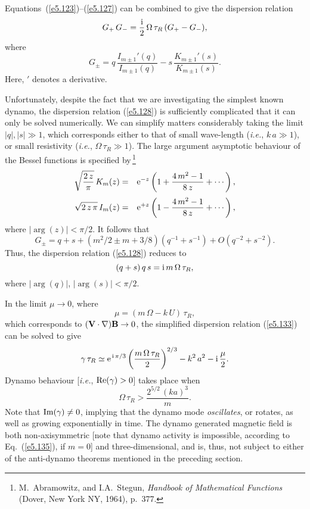 Equations~(\ref{e5.123})--(\ref{e5.127}) can be combined to give the dispersion relation
\begin{equation}\label{e5.128}
G_+\,G_- = \frac{{\rm i}}{2}\,{\Omega}\,\tau_R\,(G_+-G_-),
\end{equation}
where
\begin{equation}
G_\pm = q\,\frac{I_{m\pm 1}'(q)}{I_{m\pm 1}(q)} - s\,\frac{K_{m\pm 1}'(s)}
{K_{m\pm 1}(s)}.
\end{equation}
Here, $'$ denotes a derivative.

Unfortunately, despite the fact that we are investigating the simplest known dynamo,
the dispersion relation (\ref{e5.128}) is sufficiently complicated that it can only
be solved numerically. We can simplify matters considerably
taking the limit $|q|, |s| \gg 1$, which corresponds either
to that of small wave-length ({\em i.e.}, $k\,a\gg 1$), or small
resistivity ({\em i.e.}, ${\Omega}\,\tau_R\gg 1$). 
The large argument asymptotic behaviour of the Bessel functions is
specified by\,\footnote{M.~Abramowitz, and I.A.~Stegun, {\em Handbook of Mathematical Functions} (Dover, New York NY, 1964), p.~377.} 
\begin{eqnarray}
\sqrt{\frac{2\,z}{\pi}}\,K_m(z) &=& {\rm e}^{-z}\left(1+\frac{4\,m^2-1}{8\,z} +\cdots\right),\\[0.5ex]
\sqrt{2\,z\,\pi}\,I_m(z)&=& {\rm e}^{+z}\left(1-\frac{4\,m^2-1}{8\,z} +\cdots\right),
\end{eqnarray}
where $|\arg(z)|<\pi/2$.
It follows that
\begin{equation}
G_\pm = q + s + (m^2/2\pm m + 3/8)(q^{-1} + s^{-1}) + O(q^{-2}+s^{-2}).
\end{equation}
Thus, the dispersion relation (\ref{e5.128}) reduces to
\begin{equation}\label{e5.133}
(q+s)\,q\,s = {\rm i}\,m\,{\Omega}\,\tau_R,
\end{equation}
where $|\arg(q)|$, $|\arg(s)|<\pi/2$. 

In the limit  $\mu\rightarrow 0$, where
\begin{equation}
\mu= (m\,{\Omega}-k\,U)\,\tau_R,
\end{equation}
which corresponds to $({\bf V}\cdot\nabla){\bf B} \rightarrow 0$, the simplified dispersion
relation (\ref{e5.133}) can be solved to give
\begin{equation}\label{e5.135}
\gamma\,\tau_R \simeq {\rm e}^{\,{\rm i}\,\pi/3}\left(\frac{m\,{\Omega}\,\tau_R}
{2}\right)^{2/3} - k^2\,a^2 - {\rm i}\,\frac{\mu}{2}.
\end{equation}
Dynamo behaviour [{\em i.e.}, ${\rm Re}(\gamma)>0$] takes place
when
\begin{equation}\label{e5.136}
{\Omega}\,\tau_R > \frac{2^{5/2}\,(ka)^3}{m}.
\end{equation}
Note that ${\rm Im}(\gamma)\neq 0$, implying that the
dynamo mode {\em oscillates}, or rotates, as well as growing exponentially in time.
The dynamo generated magnetic field is both non-axisymmetric [note that
dynamo activity is impossible, according to Eq.~(\ref{e5.135}), if $m=0$] and
three-dimensional, and is, thus, not subject to either of the anti-dynamo
theorems mentioned in the preceding section.


